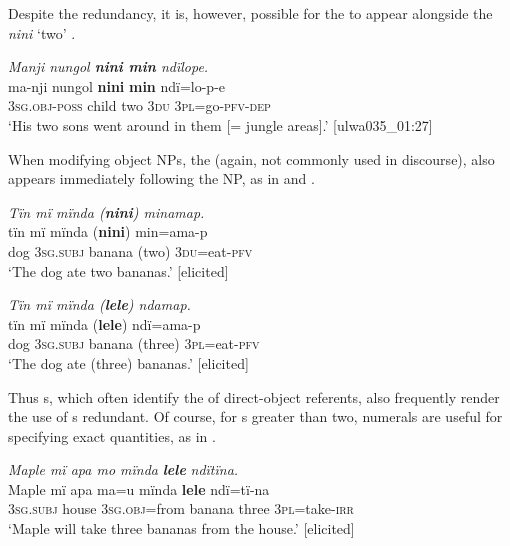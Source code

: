 

Despite the redundancy, it is, however, possible for the   to appear alongside the  \textit{nini} ‘two’ .

\ea%
    \label{ex:det:225}
          \textit{Manji nungol \textbf{nini min} ndïlope.}\\
\gll    ma-nji      nungol  \textbf{nini}  \textbf{min}  ndï=lo-p-e\\
    3\textsc{sg.obj-poss}  child  two  3\textsc{du}  \textsc{3pl}=go-\textsc{pfv-dep}\\
\glt `His two sons went around in them [= jungle areas].’ [ulwa035\_01:27]
\z

When modifying object NPs, the  (again, not commonly used in discourse), also appears immediately following the NP, as in  and .

\ea%
    \label{ex:det:226}
          \textit{Tïn mï mïnda (}\textbf{\textit{nini}}\textit{) minamap.}\\
\gll    tïn    mï      mïnda    (\textbf{nini})  min=ama-p\\
    dog  3\textsc{sg.subj}  banana    (two)  3\textsc{du}=eat-\textsc{pfv}\\
\glt `The dog ate two bananas.’ [elicited]
\z

\ea%
    \label{ex:det:227}
          \textit{Tïn mï mïnda (}\textbf{\textit{lele}}\textit{) ndamap.}\\
\gll    tïn    mï      mïnda  (\textbf{lele})  ndï=ama-p\\
    dog  3\textsc{sg.subj}  banana  (three)  3\textsc{pl}=eat-\textsc{pfv}\\
\glt `The dog ate (three) bananas.’ [elicited]
\z

Thus s, which often identify the  of direct-object referents, also frequently render the use of s redundant. Of course, for s greater than two, numerals are useful for specifying exact quantities, as in .

\ea%
    \label{ex:det:228}
          \textit{Maple mï apa mo mïnda} \textbf{\textit{lele}} \textit{ndïtïna.}\\
\gll    Maple  mï      apa    ma=u      mïnda    \textbf{lele} ndï=tï-na\\
    [name]  3\textsc{sg.subj}  house  3\textsc{sg.obj}=from  banana    three    3\textsc{pl}=take-\textsc{irr}\\
\glt `Maple will take three bananas from the house.’ [elicited]
\z

